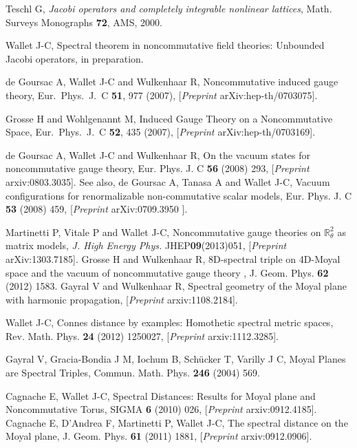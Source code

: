 \documentclass[a4paper,11pt,twoside]{article}
\numberwithin{equation}{section}
\theoremstyle{nonumberplain}
\begin{document}
\begin{thebibliography}{50}
 Teschl G, {\it{ Jacobi operators and completely integrable nonlinear lattices}}, Math. Surveys Monographs {\bf{72}}, AMS, 2000.

 Wallet J-C, {{Spectral theorem in noncommutative field theories: Unbounded Jacobi operators}}, in preparation.

de Goursac A, Wallet J-C and Wulkenhaar R, {{Noncommutative induced gauge theory}}, Eur.\ Phys.\ J.\  C {\bf 51}, 977 (2007), [{\it{Preprint }} arXiv:hep-th/0703075].

Grosse H and Wohlgenannt M, {{Induced Gauge Theory on a Noncommutative Space}}, Eur.\ Phys.\ J.\  C {\bf 52}, 435 (2007), [{\it{Preprint }} arXiv:hep-th/0703169]. 

 de Goursac A, Wallet J-C and Wulkenhaar R, {{On the vacuum states for noncommutative gauge theory}}, Eur. Phys. J. C {\bf{56}} (2008) 293, [{\it{Preprint }} arxiv:0803.3035]. 
See also, de Goursac A, Tanasa A and Wallet J-C, {{Vacuum configurations for renormalizable non-commutative scalar models}}, Eur. Phys. J. C {\bf{53}} (2008) 459, [{\it{Preprint }} arXiv:0709.3950 ].

 Martinetti P, Vitale P and Wallet J-C, {{ Noncommutative gauge theories on $\mathbb{R}^2_\theta$ as matrix models}}, {\it{J. High Energy Phys.}} {JHEP}\textbf{09}(2013)051, [{\it{Preprint }} arXiv:1303.7185].
 Grosse H and Wulkenhaar R, {{8D-spectral triple on 4D-Moyal space and the vacuum of noncommutative gauge theory }}, J. Geom. Phys. {\bf{62}} (2012) 1583. Gayral V and Wulkenhaar R, {{Spectral geometry of the Moyal plane with harmonic propagation}}, [{\it{Preprint }} arxiv:1108.2184].

 Wallet J-C, {{Connes distance by examples: Homothetic spectral metric spaces}}, Rev. Math. Phys. {\bf{24}} (2012) 1250027, [{\it{Preprint }} arxiv:1112.3285]. 

 Gayral V, Gracia-Bondia J M, Iochum B, Sch\"ucker T, Varilly J C, {{ Moyal Planes are Spectral Triples}}, Commun. Math. Phys. {\bf{246}} (2004) 569.

 Cagnache E, Wallet J-C, {{Spectral Distances: Results for Moyal plane and Noncommutative Torus}}, SIGMA {\bf{6}} (2010) 026, [{\it{Preprint }} arxiv:0912.4185]. 
Cagnache E, D'Andrea F, Martinetti P, Wallet J-C, {{The spectral distance on the Moyal plane}}, J. Geom. Phys. {\bf{61}} (2011) 1881, [{\it{Preprint }} arxiv:0912.0906].


\end{thebibliography}
\end{document}
